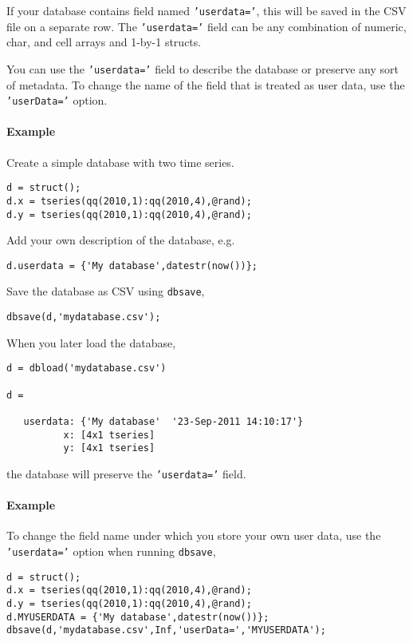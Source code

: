 If your database contains field named \texttt{'userdata='}, this will be
saved in the CSV file on a separate row. The \texttt{'userdata='} field
can be any combination of numeric, char, and cell arrays and 1-by-1
structs.

You can use the \texttt{'userdata='} field to describe the database or
preserve any sort of metadata. To change the name of the field that is
treated as user data, use the \texttt{'userData='} option.

\paragraph{Example}

Create a simple database with two time series.

\begin{verbatim}
d = struct();
d.x = tseries(qq(2010,1):qq(2010,4),@rand);
d.y = tseries(qq(2010,1):qq(2010,4),@rand);
\end{verbatim}

Add your own description of the database, e.g.

\begin{verbatim}
d.userdata = {'My database',datestr(now())};
\end{verbatim}

Save the database as CSV using \texttt{dbsave},

\begin{verbatim}
dbsave(d,'mydatabase.csv');
\end{verbatim}

When you later load the database,

\begin{verbatim}
d = dbload('mydatabase.csv')

d = 

   userdata: {'My database'  '23-Sep-2011 14:10:17'}
          x: [4x1 tseries]
          y: [4x1 tseries]
\end{verbatim}

the database will preserve the \texttt{'userdata='} field.

\paragraph{Example}

To change the field name under which you store your own user data, use
the \texttt{'userdata='} option when running \texttt{dbsave},

\begin{verbatim}
d = struct();
d.x = tseries(qq(2010,1):qq(2010,4),@rand);
d.y = tseries(qq(2010,1):qq(2010,4),@rand);
d.MYUSERDATA = {'My database',datestr(now())};
dbsave(d,'mydatabase.csv',Inf,'userData=','MYUSERDATA');
\end{verbatim}

